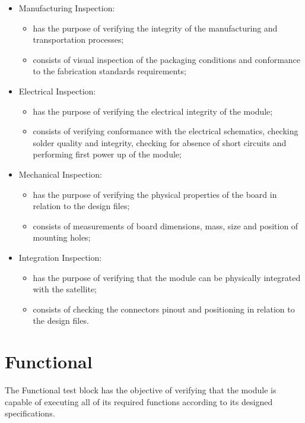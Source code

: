 \begin{itemize}
    \item Manufacturing Inspection:
    \begin{itemize}
        \item has the purpose of verifying the integrity of the manufacturing and transportation processes;
        \item consists of visual inspection of the packaging conditions and conformance to the fabrication standards requirements;
    \end{itemize}

    \item Electrical Inspection:
    \begin{itemize}
        \item has the purpose of verifying the electrical integrity of the module;
        \item consists of verifying conformance with the electrical schematics, checking solder quality and integrity, checking for absence of short circuits and performing first power up of the module;
    \end{itemize}

    \item Mechanical Inspection:
    \begin{itemize}
        \item has the purpose of verifying the physical properties of the board in relation to the design files;
        \item consists of  measurements of board dimensions, mass, size and position of mounting holes;
    \end{itemize}

    \item Integration Inspection:
    \begin{itemize}
        \item has the purpose of verifying that the module can be physically integrated with the satellite;
        \item consists of checking the connectors pinout and positioning in relation to the design files.
    \end{itemize}
\end{itemize}


\section{Functional}

The Functional test block has the objective of verifying that the module is capable of executing all of its required functions according to its designed specifications.

